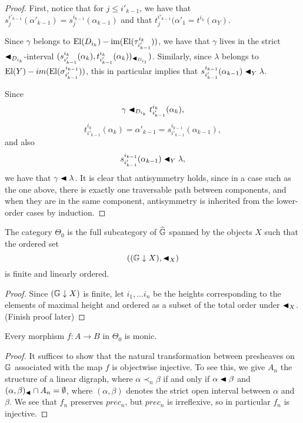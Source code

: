 \begin{proof}
First, notice that for \(j\leq i'_{k-1}\), we have that \(s^{i'_{k-1}}_j(\alpha'_{k-1})=s^{i_{k-1}}_j(\alpha_{k-1})\) and that \(t^{i'_{k-1}}_j(\alpha'_1=t^{i_k}(\alpha_Y)\).  

Since \(\gamma\) belongs to \(\operatorname{El}(D_{i_k}) - \operatorname{im}(\operatorname{El}(\tau^{i_k}_{i'_{k-1}}))\), we have that \(\gamma\) lives in the strict \(\blacktriangleleft_{D_{i_k}}\)-interval \((s^{i_k}_{i'_{k-1}}(\alpha_k),t^{i_k}_{i'_{k-1}}(\alpha_k))_{\blacktriangleleft_{D_{i_1}}})\).  Similarly, since \(\lambda\) belongs to \(\operatorname{El}(Y)-im(\operatorname{El}(\sigma^{i_{k-1}}_{i'_{k-1}}))\), this in particular implies that \(s^{i_{k-1}}_{i'_{k-1}}(\alpha_{k-1}) \blacktriangleleft_Y \lambda\).  

Since \[\gamma \blacktriangleleft_{D_{i_k}} t^{i_k}_{i'_{k-1}}(\alpha_k),\] \[t^{i_k}_{i'_{k-1}}(\alpha_k)=\alpha'_{k-1}= s^{i_{k-1}}_{i'_{k-1}}(\alpha_{k-1}),\] and also \[s^{i_{k-1}}_{i'_{k-1}}(\alpha_{k-1})\blacktriangleleft_Y \lambda,\] we have that \(\gamma \blacktriangleleft \lambda\).  It is clear that antisymmetry holds, since in a case such as the one above, there is exactly one traversable path between components, and when they are in the same component, antisymmetry is inherited from the lower-order cases by induction. 
\end{proof} 

\begin{prop}
The category \(\Theta_0\) is the full subcategory of \(\widehat{\mathbb{G}}\) spanned by the objects \(X\) such that the ordered set \[({(\mathbb{G}\downarrow X)}, \blacktriangleleft_X)\] is finite and linearly ordered.
\end{prop}
\begin{proof}
Since \({(\mathbb{G}\downarrow X)}\) is finite, let \(i_1,\dots i_n\) be the heights corresponding to the elements of maximal height and ordered as a subset of the total order under \(\blacktriangleleft_X\).  (Finish proof later)
\end{proof}

\begin{prop}
Every morphism \(f:A\to B\)  in \(\Theta_0\) is monic.
\end{prop}
\begin{proof} It suffices to show that the natural transformation between presheaves on \(\mathbb{G}\) associated with the map \(f\) is objectwise injective.  To see this, we give \(A_n\) the structure of a linear digraph, where \(\alpha \prec_n \beta\) if and only if \(\alpha \blacktriangleleft 
\beta\) and \((\alpha,\beta)_\blacktriangleleft\cap A_n=\emptyset\), where \((\alpha,\beta)\) denotes the strict open interval between \(\alpha\) and \(\beta\). We see that \(f_n\) preserves \(prec_n\), but \(prec_n\) is irreflexive, so in particular \(f_n\) is injective.    

\end{proof}

